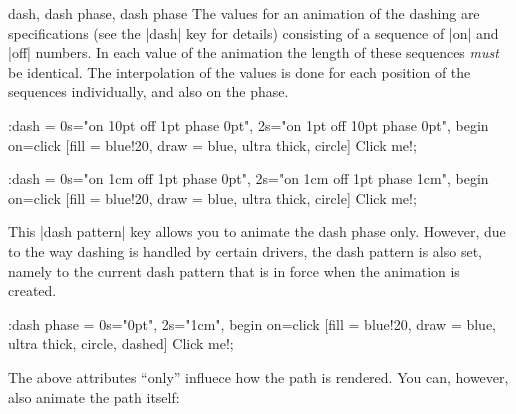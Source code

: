\begin{tikzanimateattribute}{dash, dash phase, dash phase}
  The values for an animation of the dashing are specifications (see
  the |dash| key for details) consisting of a sequence of |on| and
  |off| numbers. In each value of the animation the length of these
  sequences \emph{must} be identical. The interpolation of the values
  is done for each position of the sequences individually, and also on
  the phase.
\begin{codeexample}[animation list={0.5,1,1.5,2}]
\tikz \node :dash = { 0s="on 10pt off 1pt  phase 0pt",
                      2s="on 1pt  off 10pt phase 0pt", begin on=click}
  [fill = blue!20, draw = blue, ultra thick, circle] {Click me!}; 
\end{codeexample}
\begin{codeexample}[animation list={0.5,1,1.5,2}]
\tikz \node :dash = { 0s="on 1cm off 1pt phase 0pt",
                      2s="on 1cm off 1pt phase 1cm", begin on=click}
  [fill = blue!20, draw = blue, ultra thick, circle] {Click me!}; 
\end{codeexample}

  This |dash pattern| key allows you to animate the dash phase
  only. However, due to the way dashing is handled by certain drivers,
  the dash pattern is also set, namely to the current dash pattern
  that is in force when the animation is created.
\begin{codeexample}[animation list={0.5,1,1.5,2}]
\tikz \node :dash phase = { 0s="0pt", 2s="1cm", begin on=click}
  [fill = blue!20, draw = blue, ultra thick, circle, dashed] {Click me!}; 
\end{codeexample}
\end{tikzanimateattribute}

The above attributes ``only'' influece how the path is rendered. You
can, however, also animate the path itself:

